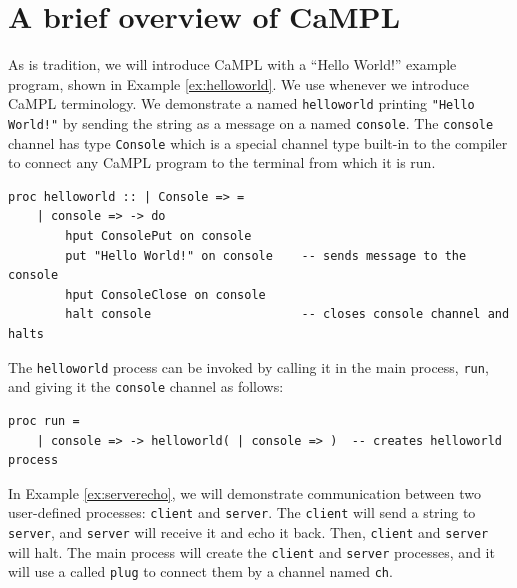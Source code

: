 \documentclass[11pt]{article}
\begin{document}




\section{A brief overview of CaMPL}
\label{Sec:brief_overview}

As is tradition, we will introduce CaMPL with a ``Hello World!'' example program, shown in Example \ref{ex:helloworld}.
We use  whenever we introduce CaMPL terminology.
We demonstrate a  named \lstinline$helloworld$ printing \lstinline$"Hello World!"$ by sending the string as a message on a  named \lstinline$console$.
The \lstinline$console$ channel has type \lstinline$Console$ which is a special channel type built-in to the compiler to connect any CaMPL program to the terminal from which it is run.
\begin{lstlisting}[label=ex:helloworld, caption=Hello World!, name=helloworld] 
proc helloworld :: | Console => = 
	| console => -> do
		hput ConsolePut on console
		put "Hello World!" on console    -- sends message to the console        
		hput ConsoleClose on console
		halt console                     -- closes console channel and halts               
\end{lstlisting}
The \lstinline$helloworld$ process can be invoked by calling it in the main process, \lstinline$run$, and giving it the \lstinline$console$ channel as follows:
\begin{lstlisting}[name=helloworld]
proc run = 
	| console => -> helloworld( | console => )  -- creates helloworld process
\end{lstlisting}


In Example \ref{ex:serverecho}, we will demonstrate communication between two user-defined processes: \lstinline$client$ and \lstinline$server$. 
The \lstinline$client$ will send a string to \lstinline$server$, and \lstinline$server$ will receive it and echo it back.
Then, \lstinline$client$ and \lstinline$server$ will halt.
The main process will create the \lstinline$client$ and \lstinline$server$ processes, and it will use a  called \lstinline$plug$ to connect them by a channel named \lstinline$ch$.
\end{document}
